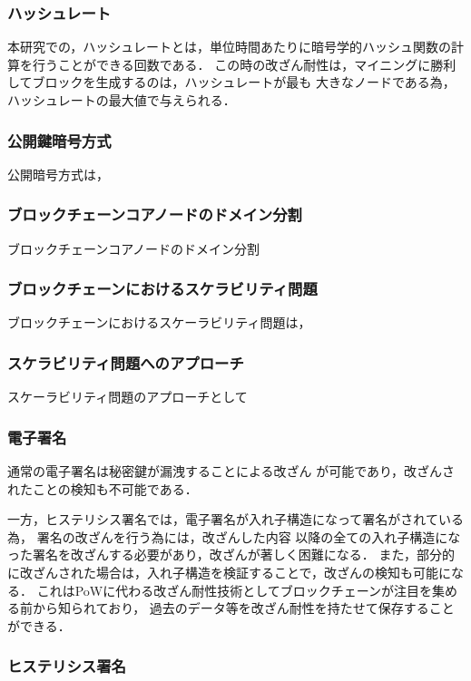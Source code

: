 \documentclass[a4paper,12pt]{jsarticle}
\begin{document}
      \subsubsection{ハッシュレート}

本研究での，ハッシュレートとは，単位時間あたりに暗号学的ハッシュ関数の計算を行うことができる回数である．
この時の改ざん耐性は，マイニングに勝利してブロックを生成するのは，ハッシュレートが最も
大きなノードである為，ハッシュレートの最大値で与えられる．

      \subsubsection{公開鍵暗号方式}

公開暗号方式は，


      \subsubsection{ブロックチェーンコアノードのドメイン分割}
ブロックチェーンコアノードのドメイン分割

      \subsubsection{ブロックチェーンにおけるスケラビリティ問題}
ブロックチェーンにおけるスケーラビリティ問題は，

      \subsubsection{スケラビリティ問題へのアプローチ}
スケーラビリティ問題のアプローチとして

      \subsubsection{電子署名}
通常の電子署名は秘密鍵が漏洩することによる改ざん
が可能であり，改ざんされたことの検知も不可能である．

一方，ヒステリシス署名では，電子署名が入れ子構造になって署名がされている為，
署名の改ざんを行う為には，改ざんした内容
以降の全ての入れ子構造になった署名を改ざんする必要があり，改ざんが著しく困難になる．
また，部分的に改ざんされた場合は，入れ子構造を検証することで，改ざんの検知も可能になる．
これはPoWに代わる改ざん耐性技術としてブロックチェーンが注目を集める前から知られており，
過去のデータ等を改ざん耐性を持たせて保存することができる．

      \subsubsection{ヒステリシス署名}
\end{document}
